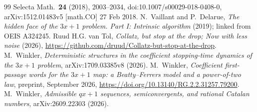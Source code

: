\documentclass[11pt,a4paper,titlepage]{article}
\begin{document}
\begin{thebibliography}{99}
  Selecta Math.\ \textbf{24} (2018), 2003--2034, doi:10.1007/s00029-018-0408-0,
  arXiv:1512.01483v5 [math.CO] 27 Feb 2018.
 N.~Vaillant and P.~Delarue, \emph{The hidden face of the
  $3x+1$ problem. Part I: Intrinsic algorithm} (2019); linked from OEIS A324245.
 Ruud H.G. van Tol, \emph{Collatz, but stop at the drop; Now with less noise}
  (2026), \url{https://github.com/druud/Collatz-but-stop-at-the-drop}.
 M.~Winkler, \emph{Deterministic structures in the
  coefficient stopping-time dynamics of the $3x+1$ problem}, arXiv:1709.03385v8 (2026).
 M.~Winkler, \emph{Coefficient first-passage words for
  the $3x+1$ map: a Beatty--Ferrers model and a power-of-two law}, preprint,
  September 2026, \url{https://doi.org/10.13140/RG.2.2.31257.79200}.
 M.~Winkler, \emph{Admissible $qx+1$ sequences,
  semiconvergents, and rational Catalan numbers}, arXiv:2609.22303 (2026).
\end{thebibliography}

\printindex
\end{document}
